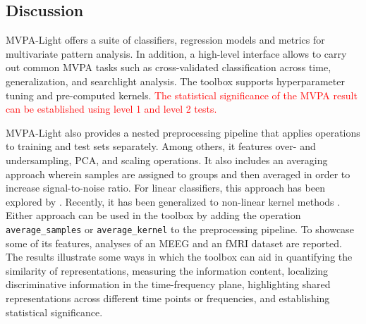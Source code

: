 \documentclass[utf8]{frontiersSCNS} %
\newcommand{\ttt}[1]{\texttt{#1}}
\newcommand{\red}[1]{\textcolor{red}{#1}}
\begin{document}
\subsection{Discussion}

MVPA-Light offers a suite of classifiers, regression models and metrics for multivariate pattern analysis. In addition, a high-level interface allows to carry out common MVPA tasks such as cross-validated classification across time,  generalization, and searchlight analysis. The toolbox supports hyperparameter tuning and pre-computed kernels. \red{The statistical significance of the MVPA result can be established using level 1 and level 2 tests.} 

MVPA-Light also provides a nested preprocessing pipeline that applies operations to training and test sets separately. Among others, it features over- and undersampling, PCA, and scaling operations. It also includes an averaging approach wherein samples are assigned to groups and then averaged in order to increase signal-to-noise ratio. For linear classifiers, this approach has been explored by \citep{Cichy2015,Cichy2017MultivariateSpace}. Recently, it has been generalized to non-linear kernel methods \citep{Treder2018}. Either approach can be used in the toolbox by adding the operation \ttt{average\_samples} or \ttt{average\_kernel} to the preprocessing pipeline. 
To showcase some of its features, analyses of an MEEG \citep{Wakeman2015ADataset} and an fMRI \citep{Haxby2001} dataset are reported. The results illustrate some ways in which the toolbox can aid in quantifying the similarity of representations, measuring the information content, localizing discriminative information in the time-frequency plane, highlighting shared representations across different time points or frequencies, and establishing statistical significance.
\end{document}
